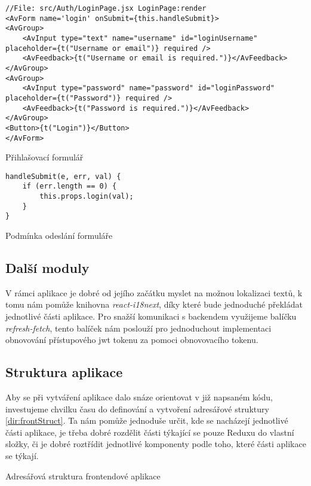 \begin{listing}[H]
    \begin{verbatim}
//File: src/Auth/LoginPage.jsx LoginPage:render
<AvForm name='login' onSubmit={this.handleSubmit}>
<AvGroup>
    <AvInput type="text" name="username" id="loginUsername" placeholder={t("Username or email")} required />
    <AvFeedback>{t("Username or email is required.")}</AvFeedback>
</AvGroup>
<AvGroup>
    <AvInput type="password" name="password" id="loginPassword" placeholder={t("Password")} required />
    <AvFeedback>{t("Password is required.")}</AvFeedback>
</AvGroup>
<Button>{t("Login")}</Button>
</AvForm>
    \end{verbatim}
    \caption{Přihlašovací formulář}
    \label{lst:loginForm}
\end{listing}

\begin{listing}[H]
    \begin{verbatim}
handleSubmit(e, err, val) {
    if (err.length == 0) {
        this.props.login(val);
    }
}
    \end{verbatim}
    \caption{Podmínka odeslání formuláře}
    \label{lst:conditionForm}
\end{listing}

\subsection{Další moduly}

V rámci aplikace je dobré od jejího začátku myslet na možnou lokalizaci textů, k tomu nám pomůže knihovna \textit{react-i18next}, díky které bude jednoduché překládat
jednotlivé části aplikace. Pro snažší komunikaci s backendem využijeme balíčku \textit{refresh-fetch}, tento balíček nám poslouží pro jednoduchout implementaci obnovování přístupového
\gls{jwt} tokenu za pomoci obnovovacího tokenu.

\subsection{Struktura aplikace}

Aby se při vytváření aplikace dalo snáze orientovat v již napsaném kódu, investujeme chvilku času do definování a vytvoření adresářové struktury \ref{dir:frontStruct}. Ta nám
pomůže jednoduše určit, kde se nacházejí jednotlivé části aplikace, je třeba dobré rozdělit části týkající se pouze Reduxu do vlastní složky, či je dobré roztřídit
jednotlivé komponenty podle toho, které části aplikace se týkají.

\begin{listing}[H]
    \caption{Adresářová struktura frontendové aplikace}
    \label{dir:frontStruct}
\end{listing}